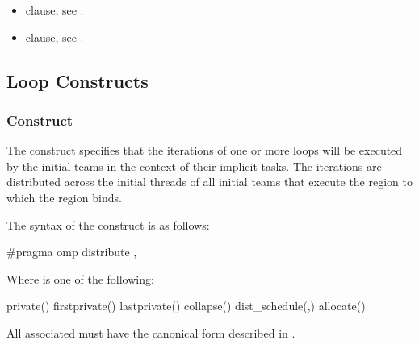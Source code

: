 \crossreferences
\begin{itemize}
\item {} clause, see
.

\item {} clause, see
.
\end{itemize}





\subsection{ Loop Constructs}
\label{sec:distribute Loop Constructs}

\subsubsection{ Construct}
\label{subsec:distribute Construct}
\summary
The  construct specifies that the iterations of one or more loops will be
executed by the initial teams in the context of their implicit tasks. The iterations are
distributed across the initial threads of all initial teams that execute the  region to
which the  region binds.

\syntax
\begin{ccppspecific}
The syntax of the  construct is as follows:

\begin{ompcPragma}
#pragma omp distribute \plc{[clause[ [},\plc{] clause] ... ] new-line}
\end{ompcPragma}

Where  is one of the following:

\begin{indentedcodelist}
private()
firstprivate()
lastprivate()
collapse()
dist_schedule(\plc{kind[},\plc{ chunk_size]})
allocate(\plc{[allocator: ]})
\end{indentedcodelist}

All associated  must have the canonical form described in
.
\end{ccppspecific}
\bigskip

